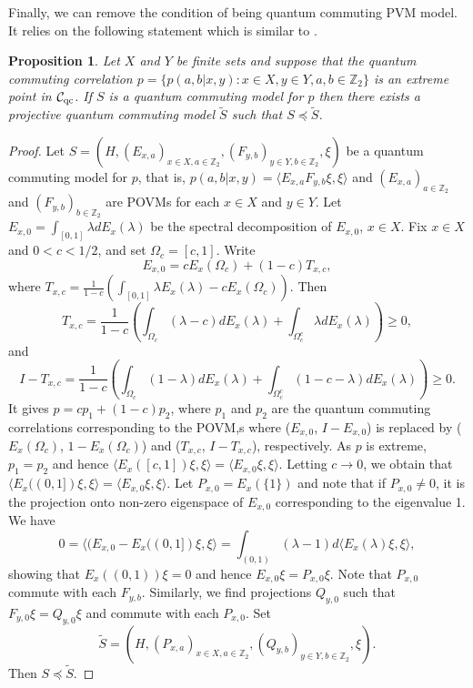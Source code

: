 \documentclass[11pt]{amsart}
\newtheorem{proposition}[theorem]{Proposition}
\theoremstyle{definition}
\newcommand{\cl}[1]{\mathcal{#1}}
\providecommand{\wt}[1]{\widetilde{#1}}
\begin{document}
\smallskip

Finally, we can remove the condition of being quantum commuting PVM model.
It relies on the following statement which is similar to \cite[Proposition 5.5]{pszz}.
\begin{proposition}\label{PVM-POVM}
Let $X$ and $Y$ be finite sets and 
suppose that the quantum commuting correlation 
$p=\{p(a,b|x,y): x\in X, y\in Y, a,b\in\mathbb Z_2\}$ is an extreme point 
in $\cl C_{\rm qc}$. If $S$ is a quantum commuting model for $p$ then there exists a projective quantum commuting model $\wt{S}$ such that $S\preceq\wt{S}$.
\end{proposition}

\begin{proof}
    Let $S=(H, (E_{x,a})_{x\in X, a\in \mathbb Z_2}, (F_{y,b})_{y\in Y, b\in \mathbb Z_2}, \xi)$ be a quantum commuting model for $p$, that is, $p(a,b|x,y)=\langle E_{x,a}F_{y,b}\xi,\xi\rangle$ and $(E_{x,a})_{a\in\mathbb Z_2}$ and $(F_{y,b})_{b\in\mathbb Z_2}$ are POVMs for each $x\in X$ and $y\in Y$. Let $E_{x,0}=\int_{[0,1]}\lambda dE_x(\lambda)$ be the spectral decomposition of $E_{x,0}$, $x\in X$. Fix $x\in X$ and $0<c<1/2$, 
    and set $\Omega_c = [c,1]$.
    Write 
    $$E_{x,0} = cE_x(\Omega_c)+(1-c)T_{x,c},$$
    where $T_{x,c} = \frac{1}{1-c}\left(\int_{[0,1]}\lambda E_{x}(\lambda)-cE_x(\Omega_c)\right)$. 
    Then 
    $$T_{x,c}=\frac{1}{1-c}\left(\int_{\Omega_c}(\lambda-c)dE_x(\lambda)+\int_{\Omega_c^c}\lambda dE_x(\lambda)\right)\geq 0,$$
    and 
    $$I-T_{x,c} = \frac{1}{1-c}\left(\int_{\Omega_c}(1-\lambda)dE_x(\lambda)+\int_{\Omega_c^c}(1-c-\lambda) dE_x(\lambda)\right)\geq 0.$$
    It gives $p=cp_1+(1-c)p_2$, where $p_1$ and $p_2$ are 
    the quantum commuting correlations corresponding to the POVM,s where ($E_{x,0}$, $I-E_{x,0} $) is replaced by 
    ($E_x(\Omega_c)$, $1-E_x(\Omega_c)$) and ($T_{x,c}$, $I-T_{x,c}$), respectively.
    As $p$ is extreme, $p_1=p_2$ and hence $\langle E_x([c,1])\xi,\xi\rangle=\langle E_{x,0}\xi,\xi\rangle$. Letting $c\to 0$, we obtain that $\langle E_x((0,1]) \xi,\xi\rangle=\langle E_{x,0}\xi,\xi\rangle$. Let $P_{x,0}=E_x(\{1\})$ and note that if $P_{x,0}\ne 0$, it is the projection onto non-zero eigenspace of $E_{x,0}$  corresponding to the eigenvalue 1.  We have
    $$0=\langle(E_{x,0}-E_x((0,1])\xi,\xi\rangle=\int_{(0,1)}(\lambda-1)d\langle E_x(\lambda)\xi,\xi\rangle,$$
    showing that $E_x((0,1))\xi=0$ and hence $E_{x,0}\xi=P_{x,0}\xi$. Note that $P_{x,0}$ commute with each $F_{y,b}$. Similarly, we find projections  $Q_{y,0}$ such that $F_{y,0}\xi=Q_{y,0}\xi$ and commute with each $P_{x,0}$. 
    Set $$\wt{S}=(H, (P_{x,a})_{x\in X,a\in\mathbb Z_2}, (Q_{y,b})_{y\in Y,b\in\mathbb Z_2},\xi).$$ Then $S\preceq\wt{S}$. 
\end{proof}
\end{document}
